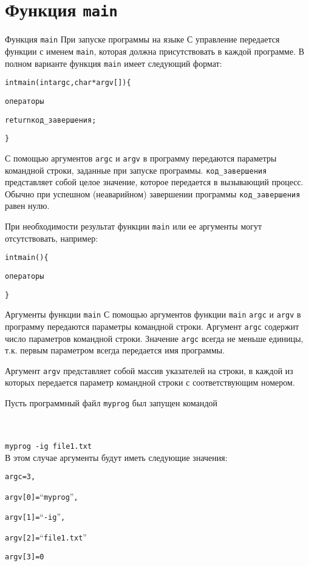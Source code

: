 \documentclass{beamer}
\begin{document}
\section{Функция \texttt{main}}
    
\begin{frame}{Функция \texttt{main}}
    При запуске программы на языке С управление передается функции с именем \texttt{main}, которая должна присутствовать в каждой программе. В полном варианте функция \texttt{main} имеет следующий формат:
    \begin{alltt}
        int main(int argc, char *argv[])\{
        
        \qquad операторы
        
        \qquad return код\_завершения;
        
        \}
    \end{alltt}
    
    С помощью аргументов \texttt{argc} и \texttt{argv} в программу передаются параметры командной строки, заданные при запуске программы. \texttt{код\_завершения} представляет собой целое значение, которое передается в вызывающий процесс. Обычно при успешном (неаварийном) завершении программы \texttt{код\_завершения} равен нулю.
    
    При необходимости результат функции \texttt{main} или ее аргументы могут отсутствовать, например:
    \begin{alltt}
        int main()\{
        
        \qquad операторы
        
        \}
    \end{alltt}
\end{frame}

\begin{frame}{Аргументы функции \texttt{main}}
    С помощью аргументов функции \texttt{main} \texttt{argc} и \texttt{argv} в программу передаются параметры командной строки. 
    Аргумент \texttt{argc} содержит число параметров командной строки. Значение \texttt{argc} всегда не меньше единицы, т.к. первым параметром всегда передается имя программы. 
    
    Аргумент \texttt{argv} представляет собой массив указателей на строки, в каждой из которых передается параметр командной строки с соответствующим номером.
    
    Пусть программный файл \texttt{myprog} был запущен командой
    
    \\ \\
    \texttt{myprog -ig file1.txt}
    \\
    
    В этом случае аргументы будут иметь следующие значения:
    \begin{alltt}
        argc = 3,
        
        argv[0] = “myprog”,
        
        argv[1] = “-ig”,
        
        argv[2] = “file1.txt”
        
        argv[3] = 0
    \end{alltt}
\end{frame}
\end{document}
